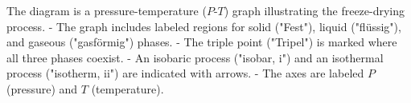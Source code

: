 The diagram is a pressure-temperature (\( P \)-\( T \)) graph illustrating the freeze-drying process.  
- The graph includes labeled regions for solid ("Fest"), liquid ("flüssig"), and gaseous ("gasförmig") phases.  
- The triple point ("Tripel") is marked where all three phases coexist.  
- An isobaric process ("isobar, i") and an isothermal process ("isotherm, ii") are indicated with arrows.  
- The axes are labeled \( P \) (pressure) and \( T \) (temperature).